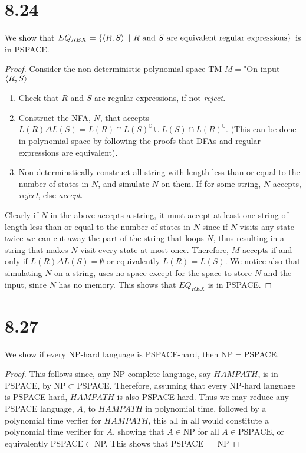 \documentclass[a4paper,11pt]{article}
\newcommand{\pipe}{\ \vert \ }
\numberwithin{equation}{section}
\begin{document}
	\section*{8.24}
	We show that $ EQ_{REX}=\{\braket{R,S}\pipe R\text{ and }S\text{ are equivalent regular expressions} \} $ is in PSPACE.
	\begin{proof}
		Consider the non-deterministic polynomial space TM $ M= $"On input $ \braket{R,S} $\begin{enumerate}
			\item Check that $ R $ and $ S $ are regular expressions, if not \emph{reject}.\\
			\item Construct the NFA, $ N $, that accepts $ L(R)\Delta L(S)=L(R)\cap L(S)^\complement\cup L(S)\cap L(R)^\complement $. (This can be done in polynomial space by following the proofs that DFAs and regular expressions are equivalent).
			\item Non-determinstically construct all string with length less than or equal to the number of states in $ N $, and simulate $ N $ on them. If for some string, $ N $ accepts, \emph{reject}, else \emph{accept}.
		\end{enumerate}
		Clearly if $ N $ in the above accepts a string, it must accept at least one string of length less than or equal to the number of states in $ N $ since if $ N $ visits any state twice we can cut away the part of the string that loops $ N $, thus resulting in a string that makes $ N $ visit every state at most once. Therefore, $ M $ accepts if and only if $ L(R)\Delta L(S)=\emptyset $ or equivalently $ L(R)=L(S) $. We notice also that simulating $ N $ on a string, uses no space except for the space to store $ N $ and the input, since $ N $ has no memory. This shows that $ EQ_{REX} $ is in PSPACE.
	\end{proof}
	\section*{8.27}
	We show if every NP-hard  language is PSPACE-hard, then NP$ = $PSPACE.
	\begin{proof}
		This follows since, any NP-complete language, say $ HAMPATH $, is in PSPACE, by NP$ \subset $PSPACE. Therefore, assuming that every NP-hard  language is PSPACE-hard, $ HAMPATH $ is also PSPACE-hard. Thus we may reduce any PSPACE language, $ A $, to $ HAMPATH $ in polynomial time, followed by a polynomial time verfier for $ HAMPATH $, this all in all would constitute a polynomial time verifier for $ A $, showing that $ A\in\text{NP} $ for all $ A\in \text{PSPACE} $, or equivalently PSPACE$ \subset $NP. This shows that PSPACE$ = $ NP
	\end{proof}
\end{document}
